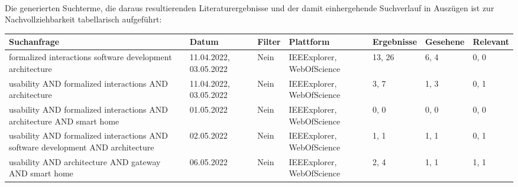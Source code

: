         \\
        Die generierten Suchterme, die daraus resultierenden Literaturergebnisse und der damit einhergehende Suchverlauf in Auszügen ist 
        zur Nachvollziehbarkeit tabellarisch aufgeführt:
        \\
        \linebreak
        \pagebreak
        \begin{table}[hbt!]
            \begin{center}
                \begin{tabular}{| p{2.9cm} | p{1.9cm} | p{1.6cm} | p{1.9cm} | p{1.9cm} | p{1.8cm} | p{1.8cm} | }
                    \hline
                        \textbf{Suchanfrage} & \textbf{Datum} & \textbf{Filter} & \textbf{Plattform} & \textbf{Ergebnisse} & \textbf{Gesehene} & \textbf{Relevant} \\
                    \hline
                        formalized interactions software development architecture  & 11.04.2022, 03.05.2022 & Nein & IEEExplorer, WebOfScience & 13, 26 & 6, 4 & 0, 0 \\ 
                    \hline
                        usability AND formalized interactions AND architecture & 11.04.2022, 03.05.2022 & Nein & IEEExplorer, WebOfScience & 3, 7 & 1, 3 & 0, 1 \\ %
                    \hline
                        usability AND formalized interactions AND architecture AND smart home & 01.05.2022 & Nein & IEEExplorer, WebOfScience & 0, 0 & 0, 0 & 0, 0 \\
                    \hline
                        usability AND formalized interactions AND software development AND architecture & 02.05.2022 & Nein & IEEExplorer, WebOfScience & 1, 1 & 1, 1 & 0, 1 \\
                    \hline
                        usability AND architecture AND gateway AND smart home & 06.05.2022 & Nein & IEEExplorer, WebOfScience & 2, 4 & 1, 1 & 1, 1 \\

\end{tabular}
\end{center}
\end{table}
